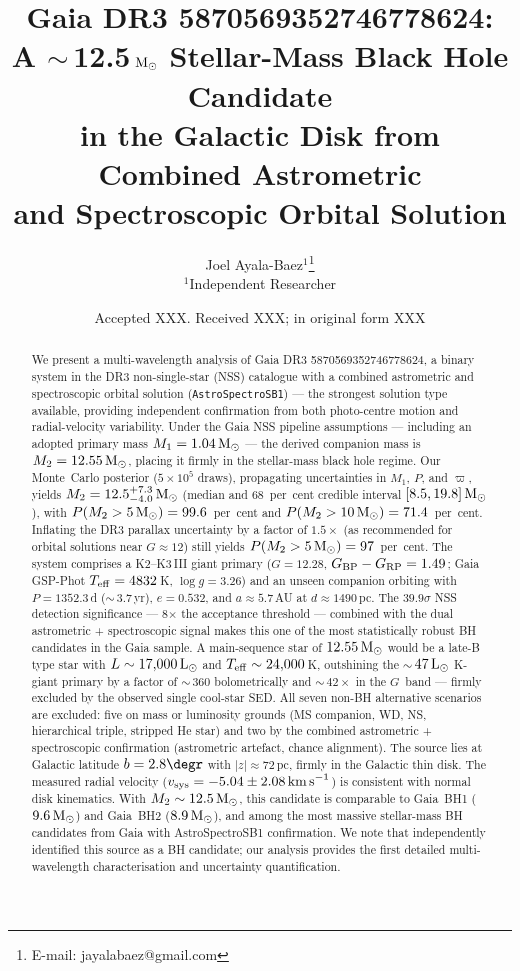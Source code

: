 \documentclass[usenatbib,fleqn]{mnras}
\title[Gaia DR3 5870569352746778624: A Stellar-Mass BH in the Disk]
{Gaia DR3 5870569352746778624:\\
 A $\sim$\,12.5\,$\Msun$ Stellar-Mass Black Hole Candidate\\
 in the Galactic Disk from Combined Astrometric\\
 and Spectroscopic Orbital Solution}
\author[J. Ayala-Baez]{
  Joel Ayala-Baez$^{1}$\thanks{E-mail: jayalabaez@gmail.com}\\
  $^{1}$Independent Researcher
}
\date{Accepted XXX. Received XXX; in original form XXX}
\newcommand{\Msun}{{\rm M}_\odot}
\newcommand{\Lsun}{{\rm L}_\odot}
\newcommand{\kms}{{\rm km\,s}^{-1}}
\begin{document}
\label{firstpage}
\pagerange{\pageref{firstpage}--\pageref{LastPage}}
\maketitle

\begin{abstract}
We present a multi-wavelength analysis of Gaia DR3
5870569352746778624, a binary system in the DR3 non-single-star
(NSS) catalogue with a combined astrometric and spectroscopic
orbital solution (\texttt{AstroSpectroSB1}) --- the strongest
solution type available, providing independent confirmation from
both photo-centre motion and radial-velocity variability.  Under
the Gaia NSS pipeline assumptions --- including an adopted primary
mass $M_1 = 1.04\,\Msun$ --- the derived companion mass is
$M_2 = 12.55\,\Msun$, placing it firmly in the stellar-mass
black hole regime.  Our Monte~Carlo posterior
($5 \times 10^5$ draws), propagating uncertainties in $M_1$, $P$,
and $\varpi$, yields
$M_2 = 12.5^{+7.3}_{-4.0}\,\Msun$ (median and 68~per~cent
credible interval $[8.5, 19.8]\,\Msun$), with
$P(M_2 > 5\,\Msun) = 99.6$~per~cent and
$P(M_2 > 10\,\Msun) = 71.4$~per~cent.
Inflating the DR3 parallax uncertainty by a factor of $1.5\times$
(as recommended for orbital solutions near $G \approx 12$)
still yields $P(M_2 > 5\,\Msun) = 97$~per~cent.  The system comprises a
K2--K3\,III giant primary ($G = 12.28$,
$G_{\rm BP} - G_{\rm RP} = 1.49$; Gaia GSP-Phot
$T_{\rm eff} = 4832$\,K, $\log g = 3.26$)
and an unseen companion orbiting with $P = 1352.3$\,d
($\sim$\,3.7\,yr), $e = 0.532$, and $a \approx 5.7$\,AU at
$d \approx 1490$\,pc.  The $39.9\sigma$ NSS detection significance
--- 8$\times$ the acceptance threshold --- combined with the dual
astrometric + spectroscopic signal makes this one of the most
statistically robust BH candidates in the Gaia sample.  A
main-sequence star of $12.55\,\Msun$ would be a late-B type star
with $L \sim 17{,}000\,\Lsun$ and
$T_{\rm eff} \sim 24{,}000$\,K, outshining the
$\sim$\,$47\,\Lsun$ K-giant primary by a factor of
$\sim$\,$360$ bolometrically and $\sim$\,$42\times$ in the
$G$~band --- firmly excluded by the observed single
cool-star SED.  All seven non-BH alternative scenarios are
excluded: five on mass or luminosity grounds (MS companion, WD,
NS, hierarchical triple, stripped He star) and two by the
combined astrometric + spectroscopic confirmation (astrometric
artefact, chance alignment).  The source lies at Galactic
latitude $b = 2.8\degr$ with $|z| \approx 72$\,pc, firmly in
the Galactic thin disk.  The measured radial velocity
($v_{\rm sys} = -5.04 \pm 2.08\,\kms$) is consistent with
normal disk kinematics.  With $M_2 \sim 12.5\,\Msun$, this
candidate is comparable to Gaia~BH1 ($9.6\,\Msun$) and Gaia~BH2
($8.9\,\Msun$), and among the most massive stellar-mass BH
candidates from Gaia with AstroSpectroSB1 confirmation.
We note that \citet{Tanikawa2023} independently identified this
source as a BH candidate; our analysis provides the first
detailed multi-wavelength characterisation and uncertainty
quantification.
\end{abstract}
\end{document}
